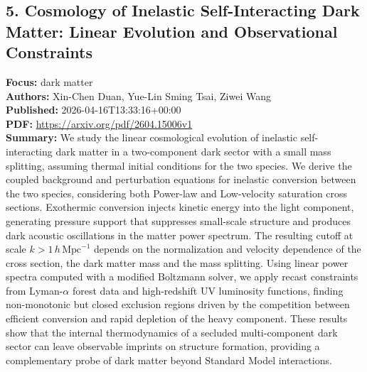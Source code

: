 \documentclass[11pt]{article}
\begin{document}
\subsection*{5. Cosmology of Inelastic Self-Interacting Dark Matter: Linear Evolution and Observational Constraints}
\textbf{Focus:} dark matter\\
\textbf{Authors:} Xin-Chen Duan, Yue-Lin Sming Tsai, Ziwei Wang\\
\textbf{Published:} 2026-04-16T13:33:16+00:00\\
\textbf{PDF:} \href{https://arxiv.org/pdf/2604.15006v1}{https://arxiv.org/pdf/2604.15006v1}\\
\textbf{Summary:}
We study the linear cosmological evolution of inelastic self-interacting dark matter in a two-component dark sector with a small mass splitting, assuming thermal initial conditions for the two species. We derive the coupled background and perturbation equations for inelastic conversion between the two species, considering both Power-law and Low-velocity saturation cross sections. Exothermic conversion injects kinetic energy into the light component, generating pressure support that suppresses small-scale structure and produces dark acoustic oscillations in the matter power spectrum. The resulting cutoff at scale $k > 1\,h\,\mathrm{Mpc}^{-1}$ depends on the normalization and velocity dependence of the cross section, the dark matter mass and the mass splitting. Using linear power spectra computed with a modified Boltzmann solver, we apply recast constraints from Lyman-$\alpha $ forest data and high-redshift UV luminosity functions, finding non-monotonic but closed exclusion regions driven by the competition between efficient conversion and rapid depletion of the heavy component. These results show that the internal thermodynamics of a secluded multi-component dark sector can leave observable imprints on structure formation, providing a complementary probe of dark matter beyond Standard Model interactions.
\newpage
\end{document}
